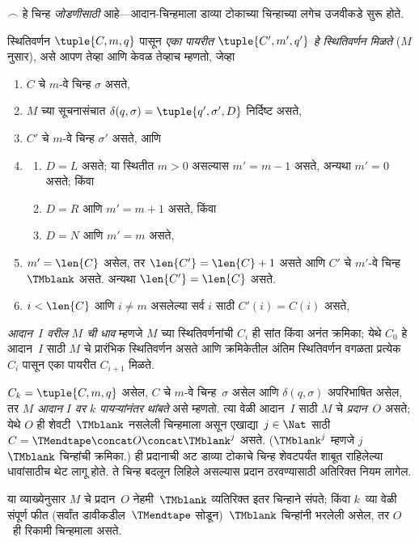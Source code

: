 \documentclass[../../../include/open-logic-section]{subfiles}
\begin{document}
\begin{explain}
$\frown$ हे चिन्ह \emph{जोडणीसाठी} आहे---आदान-चिन्हमाला डाव्या
टोकाच्या चिन्हाच्या लगेच उजवीकडे सुरू होते.
%
\end{explain}

\begin{defn}
स्थितिवर्णन $\tuple{C, m, q}$ पासून \emph{एका पायरीत
$\tuple{C', m', q'}$ हे स्थितिवर्णन मिळते} ($M$ नुसार), असे आपण
तेव्हा आणि केवळ तेव्हाच म्हणतो, जेव्हा
\begin{enumerate}
\item $C$ चे $m$-वे चिन्ह $\sigma$ असते,
\item $M$ च्या सूचनासंचात $\delta(q, \sigma) =
  \tuple{q', \sigma', D}$ निर्दिष्ट असते,
\item $C'$ चे $m$-वे चिन्ह $\sigma'$ असते, आणि
\item
\begin{enumerate}
\item $D = L$ असते; या स्थितीत $m>0$ असल्यास $m' = m - 1$ असते, अन्यथा $m'=0$ असते; किंवा
\item $D = R$ आणि $m' = m + 1$ असते, किंवा
\item $D = N$ आणि $m' = m$ असते,
\end{enumerate}
\item $m' = \len{C}$ असेल, तर $\len{C'} = \len{C} + 1$ असते आणि
  $C'$ चे $m'$-वे चिन्ह~$\TMblank$ असते. अन्यथा $\len{C'}=\len{C}$ असते.
\item $i < \len{C}$ आणि $i \neq m$ असलेल्या सर्व $i$ साठी $C'(i) = C(i)$ असते,
\end{enumerate}
\end{defn}

\begin{defn}
\emph{आदान~$I$ वरील $M$ ची धाव} म्हणजे $M$ च्या स्थितिवर्णनांची
$C_i$ ही सांत किंवा अनंत क्रमिका; येथे $C_0$ हे आदान~$I$ साठी $M$ चे प्रारंभिक
स्थितिवर्णन असते आणि क्रमिकेतील अंतिम स्थितिवर्णन वगळता प्रत्येक $C_i$ पासून एका पायरीत $C_{i+1}$
मिळते.
%

$C_k = \tuple{C, m, q}$ असेल, $C$ चे $m$-वे चिन्ह~$\sigma$ असेल
आणि $\delta(q,
\sigma)$ अपरिभाषित असेल, तर $M$ \emph{आदान $I$ वर $k$
पायऱ्यांनंतर थांबते} असे म्हणतो. त्या वेळी आदान~$I$ साठी $M$ चे
\emph{प्रदान}~$O$ असते; येथे $O$ ही शेवटी~$\TMblank$ नसलेली
चिन्हमाला असून एखाद्या~$j \in \Nat$ साठी
$C = \TMendtape \concat O \concat \TMblank^j$ असते.
($\TMblank^j$ म्हणजे $j$ $\TMblank$ चिन्हांची क्रमिका.)
ही प्रदानाची अट डाव्या टोकाचे चिन्ह शेवटपर्यंत शाबूत राहिलेल्या
धावांसाठीच थेट लागू होते. ते चिन्ह बदलून लिहिले असल्यास प्रदान
ठरवण्यासाठी अतिरिक्त नियम लागेल.
%
\end{defn}

\begin{explain}
या व्याख्येनुसार $M$ चे प्रदान~$O$ नेहमी~$\TMblank$ व्यतिरिक्त
इतर चिन्हाने संपते; किंवा $k$~व्या वेळी संपूर्ण फीत (सर्वांत
डावीकडील~$\TMendtape$ सोडून)~$\TMblank$ चिन्हांनी भरलेली असेल,
तर $O$~ही रिकामी चिन्हमाला असते.
\end{explain}
\end{document}
